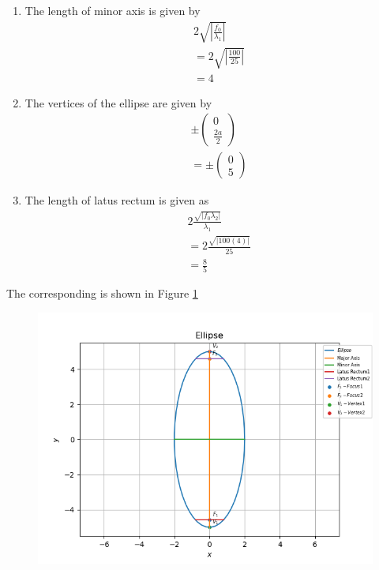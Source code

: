\documentclass[12pt]{article}
\providecommand{\brak}[1]{\ensuremath{\left(#1\right)}}
\providecommand{\abs}[1]{\left\vert#1\right\vert}
\newcommand{\myvec}[1]{\ensuremath{\begin{pmatrix}#1\end{pmatrix}}}
\begin{document}
\begin{enumerate}
\item The length of minor axis is given by
\begin{align}
	& 2\sqrt{\abs{\frac{f_0}{\lambda_1}}}\\
	&= 2\sqrt{\abs{\frac{100}{25}}}\\
	&= 4
\end{align}
\item The vertices of the ellipse are given by
\begin{align}
	& \pm \myvec{0\\\frac{2a}{2}}\\
	&= \pm \myvec{0\\5}
\end{align}
\item The length of latus rectum is given as
\begin{align}
	& 2\frac{\sqrt{\abs{f_0 \lambda_2}}}{\lambda_1}\\
	&= 2\frac{\sqrt{\abs{100\brak{4}}}}{25}\\
	&= \frac{8}{5}
\end{align}
\end{enumerate}
The corresponding is shown in Figure \ref{fig:Fig1}
\begin{figure}[!h]
	\begin{center} 
	    \includegraphics[width=\columnwidth]{figs/ellipse}
	\end{center}
\caption{}
\label{fig:Fig1}
\end{figure}
\end{document}
